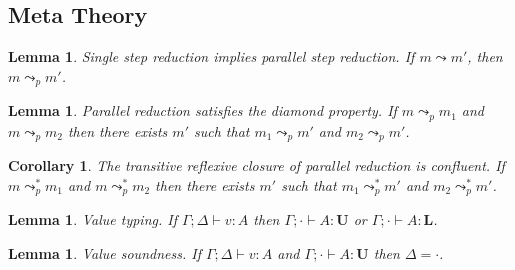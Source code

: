 \documentclass{article}
\newtheorem{corollary}{Corollary}[theorem]
\newtheorem{lemma}[theorem]{Lemma}
\newcommand{\U}{\textbf{U}}
\renewcommand{\L}{\textbf{L}}
\newcommand{\step}{\leadsto}
\newcommand{\pstep}{\leadsto_p}
\begin{document}
  \subsection{Meta Theory}
  \begin{lemma}
    Single step reduction implies parallel step reduction. If $m \step m'$, then $m \pstep m'$.
  \end{lemma}

  \begin{lemma}
    Parallel reduction satisfies the diamond property. If $m \pstep m_1$ and $m \pstep m_2$ then there exists $m'$ such that $m_1 \pstep m'$ and $m_2 \pstep m'$.
  \end{lemma}

  \begin{corollary}
    The transitive reflexive closure of parallel reduction is confluent. If $m \pstep^* m_1$ and $m \pstep^* m_2$ then there exists $m'$ such that $m_1 \pstep^* m'$ and $m_2 \pstep^* m'$.
  \end{corollary}

  \begin{lemma}
    Value typing. If $\Gamma; \Delta \vdash v : A$ then $\Gamma; \cdot \vdash A : \U$ or $\Gamma; \cdot \vdash A : \L$.
  \end{lemma}

  \begin{lemma}
    Value soundness. If $\Gamma; \Delta \vdash v : A$ and $\Gamma; \cdot \vdash A : \U$ then $\Delta = \cdot$.
  \end{lemma}
\end{document}
